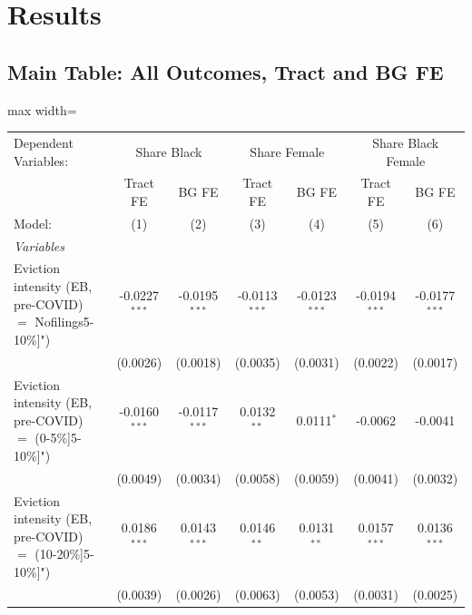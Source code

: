 \documentclass[
  11pt,
]{article}
\begin{document}
\section{Results}\label{results}

\subsection{Main Table: All Outcomes, Tract and BG
FE}\label{main-table-all-outcomes-tract-and-bg-fe}

\begin{adjustbox}{max width=\textwidth}
\begingroup
\centering
\begin{tabular}{lcccccc}
   \tabularnewline \midrule \midrule
   Dependent Variables: & \multicolumn{2}{c}{Share Black} & \multicolumn{2}{c}{Share Female} & \multicolumn{2}{c}{Share Black Female}\\
                                                               & Tract FE        & BG FE           & Tract FE        & BG FE           & Tract FE        & BG FE \\   
   Model:                                                      & (1)             & (2)             & (3)             & (4)             & (5)             & (6)\\  
   \midrule
   \emph{Variables}\\
   Eviction intensity (EB, pre-COVID) $=$ Nofilings5-10\%]")   & -0.0227$^{***}$ & -0.0195$^{***}$ & -0.0113$^{***}$ & -0.0123$^{***}$ & -0.0194$^{***}$ & -0.0177$^{***}$\\   
                                                               & (0.0026)        & (0.0018)        & (0.0035)        & (0.0031)        & (0.0022)        & (0.0017)\\   
   Eviction intensity (EB, pre-COVID) $=$ (0-5\%]5-10\%]")     & -0.0160$^{***}$ & -0.0117$^{***}$ & 0.0132$^{**}$   & 0.0111$^{*}$    & -0.0062         & -0.0041\\   
                                                               & (0.0049)        & (0.0034)        & (0.0058)        & (0.0059)        & (0.0041)        & (0.0032)\\   
   Eviction intensity (EB, pre-COVID) $=$ (10-20\%]5-10\%]")   & 0.0186$^{***}$  & 0.0143$^{***}$  & 0.0146$^{**}$   & 0.0131$^{**}$   & 0.0157$^{***}$  & 0.0136$^{***}$\\   
                                                               & (0.0039)        & (0.0026)        & (0.0063)        & (0.0053)        & (0.0031)        & (0.0025)\\   

\end{tabular}
\end{adjustbox}
\end{document}
